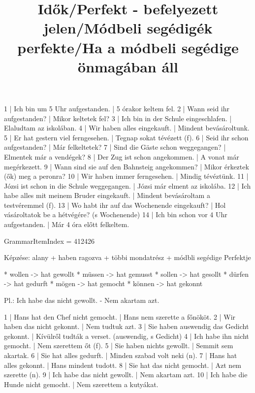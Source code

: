 \begin{exmp}
1 | Ich bin um 5 Uhr aufgestanden. | 5 órakor keltem fel.
2 | Wann seid ihr aufgestanden? | Mikor keltetek fel?
3 | Ich bin in der Schule eingeschlafen. | Elaludtam az iskolában.
4 | Wir haben alles eingekauft. | Mindent bevásároltunk.
5 | Er hat gestern viel ferngesehen. | Tegnap sokat tévézett (f).
6 | Seid ihr schon aufgestanden? | Már felkeltetek?
7 | Sind die Gäste schon weggegangen? | Elmentek már a vendégek?
8 | Der Zug ist schon angekommen. | A vonat már megérkezett.
9 | Wann sind sie auf den Bahnsteig angekommen? | Mikor érkeztek (ők) meg a peronra?
10 | Wir haben immer ferngesehen. | Mindig tévéztünk.
11 | Józsi ist schon in die Schule weggegangen. | Józsi már elment az iskolába.
12 | Ich habe alles mit meinem Bruder eingekauft. | Mindent bevásároltam a testvéremmel (f).
13 | Wo habt ihr auf das Wochenende eingekauft? | Hol vásároltatok be a hétvégére? (s Wochenende)
14 | Ich bin schon vor 4 Uhr aufgestanden. | Már 4 óra előtt felkeltem.
\end{exmp}

\title{Idők/Perfekt - befelyezett jelen/Módbeli segédigék perfekte/Ha a módbeli segédige önmagában áll}

GrammarItemIndex = 412426

\begin{desc}
Képzése:
alany + haben ragozva + többi mondatrész + módbli segédige Perfektje

* wollen -> hat gewollt
* müssen -> hat gemusst
* sollen -> hat gesollt
* dürfen -> hat gedurft
* mögen -> hat gemocht
* können -> hat gekonnt

Pl.: Ich habe das nicht gewollt. - Nem akartam azt.
\end{desc}

\begin{exmp}
1 | Hans hat den Chef nicht gemocht. | Hans nem szerette a főnököt.
2 | Wir haben das nicht gekonnt. | Nem tudtuk azt.
3 | Sie haben auswendig das Gedicht gekonnt. | Kívülről tudták a verset. (auswendig, s Gedicht)
4 | Ich habe ihn nicht gemocht. | Nem szerettem őt (f).
5 | Sie haben nichts gewollt. | Semmit sem akartak.
6 | Sie hat alles gedurft. | Minden szabad volt neki (n).
7 | Hans hat alles gekonnt. | Hans mindent tudott.
8 | Sie hat das nicht gemocht. | Azt nem szerette (n).
9 | Ich habe das nicht gewollt. | Nem akartam azt.
10 | Ich habe die Hunde nicht gemocht. | Nem szerettem a kutyákat.
\end{exmp}

